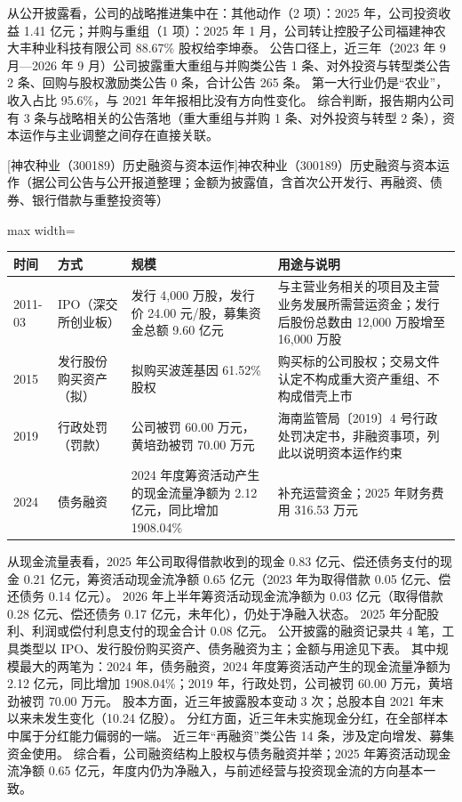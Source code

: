  从公开披露看，公司的战略推进集中在：其他动作（2 项）：2025 年，公司投资收益 1.41 亿元；并购与重组（1 项）：2025 年 1 月，公司转让控股子公司福建神农大丰种业科技有限公司 88.67\% 股权给李坤泰。 公告口径上，近三年（2023 年 9 月---2026 年 9 月）公司披露重大重组与并购类公告 1 条、对外投资与转型类公告 2 条、回购与股权激励类公告 0 条，合计公告 265 条。 第一大行业仍是“农业”，收入占比 95.6\%，与 2021 年年报相比没有方向性变化。 综合判断，报告期内公司有 3 条与战略相关的公告落地（重大重组与并购 1 条、对外投资与转型 2 条），资本运作与主业调整之间存在直接关联。

\begin{center}\small\setlength{\tabcolsep}{4pt}
[神农种业（300189）历史融资与资本运作]{神农种业（300189）历史融资与资本运作（据公司公告与公开报道整理；金额为披露值，含首次公开发行、再融资、债券、银行借款与重整投资等）}
\begin{adjustbox}{max width=\textwidth}
\begin{tabular}{@{}p{1.45cm}p{2.55cm}p{4.05cm}p{4.95cm}@{}}
\toprule
时间 & 方式 & 规模 & 用途与说明 \\
\midrule
2011-03 & IPO（深交所创业板） & 发行 4,\allowbreak{}000 万股，\allowbreak{}发行价 24.00 元/\allowbreak{}股，\allowbreak{}募集资金总额 9.60 亿元 & 与主营业务相关的项目及主营业务发展所需营运资金；发行后股份总数由 12,\allowbreak{}000 万股增至 16,\allowbreak{}000 万股 \\
2015 & 发行股份购买资产（拟） & 拟购买波莲基因 61.52\% 股权 & 购买标的公司股权；交易文件认定不构成重大资产重组、\allowbreak{}不构成借壳上市 \\
2019 & 行政处罚（罚款） & 公司被罚 60.00 万元，\allowbreak{}黄培劲被罚 70.00 万元 & 海南监管局〔2019〕4 号行政处罚决定书，\allowbreak{}非融资事项，\allowbreak{}列此以说明资本运作约束 \\
2024 & 债务融资 & 2024 年度筹资活动产生的现金流量净额为 2.12 亿元，\allowbreak{}同比增加 1908.04\% & 补充运营资金；2025 年财务费用 316.53 万元 \\
\bottomrule
\end{tabular}
\end{adjustbox}
\end{center}

 从现金流量表看，2025 年公司取得借款收到的现金 0.83 亿元、偿还债务支付的现金 0.21 亿元，筹资活动现金流净额 0.65 亿元（2023 年为取得借款 0.05 亿元、偿还债务 0.14 亿元）。 2026 年上半年筹资活动现金流净额为 0.03 亿元（取得借款 0.28 亿元、偿还债务 0.17 亿元，未年化），仍处于净融入状态。 2025 年分配股利、利润或偿付利息支付的现金合计 0.08 亿元。 公开披露的融资记录共 4 笔，工具类型以 IPO、发行股份购买资产、债务融资为主；金额与用途见下表。 其中规模最大的两笔为：2024 年，债务融资，2024 年度筹资活动产生的现金流量净额为 2.12 亿元，同比增加 1908.04\%；2019 年，行政处罚，公司被罚 60.00 万元，黄培劲被罚 70.00 万元。 股本方面，近三年披露股本变动 3 次；总股本自 2021 年末以来未发生变化（10.24 亿股）。 分红方面，近三年未实施现金分红，在全部样本中属于分红能力偏弱的一端。 近三年“再融资”类公告 14 条，涉及定向增发、募集资金使用。 综合看，公司融资结构上股权与债务融资并举；2025 年筹资活动现金流净额 0.65 亿元，年度内仍为净融入，与前述经营与投资现金流的方向基本一致。

